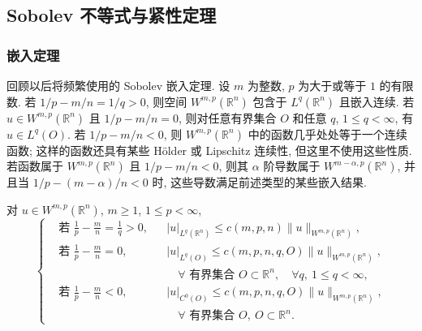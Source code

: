 \hypertarget{chapter-02-page-121}{}
\subsection{Sobolev 不等式与紧性定理}
\label{subsec:ch2-sobolev-compactness}

\subsubsection*{嵌入定理}

回顾以后将频繁使用的 Sobolev 嵌入定理. 设 $m$ 为整数, $p$ 为大于或等于 $1$ 的有限数. 若 $1/p-m/n=1/q>0$, 则空间 $W^{m,p}(\mathbb R^n)$ 包含于 $L^q(\mathbb R^n)$ 且嵌入连续. 若 $u\in W^{m,p}(\mathbb R^n)$ 且 $1/p-m/n=0$, 则对任意有界集合 $O$ 和任意 $q$, $1\leq q<\infty$, 有 $u\in L^q(O)$. 若 $1/p-m/n<0$, 则 $W^{m,p}(\mathbb R^n)$ 中的函数几乎处处等于一个连续函数; 这样的函数还具有某些 Hölder 或 Lipschitz 连续性, 但这里不使用这些性质. 若函数属于 $W^{m,p}(\mathbb R^n)$ 且 $1/p-m/n<0$, 则其 $\alpha$ 阶导数属于 $W^{m-\alpha,p}(\mathbb R^n)$, 并且当 $1/p-(m-\alpha)/n<0$ 时, 这些导数满足前述类型的某些嵌入结果.

对 $u\in W^{m,p}(\mathbb R^n)$, $m\geq1$, $1\leq p<\infty$,
\begin{equation}
\left\{
\begin{aligned}
&\text{若 }\frac1p-\frac mn=\frac1q>0,
&&\lvert u\rvert_{L^q(\mathbb R^n)}
\leq c(m,p,n)\lVert u\rVert_{W^{m,p}(\mathbb R^n)},\\
&\text{若 }\frac1p-\frac mn=0,
&&\lvert u\rvert_{L^q(O)}
\leq c(m,p,n,q,O)\lVert u\rVert_{W^{m,p}(\mathbb R^n)},\\
&&&\quad\forall\text{ 有界集合 }O\subset\mathbb R^n,
\quad\forall q,\ 1\leq q<\infty,\\
&\text{若 }\frac1p-\frac mn<0,
&&\lvert u\rvert_{C^0(O)}
\leq c(m,p,n,q,O)\lVert u\rVert_{W^{m,p}(\mathbb R^n)},\\
&&&\quad\forall\text{ 有界集合 }O,\ O\subset\mathbb R^n.
\end{aligned}
\right.
\label{eq:ch2-sobolev-rn-embeddings}
\end{equation}

